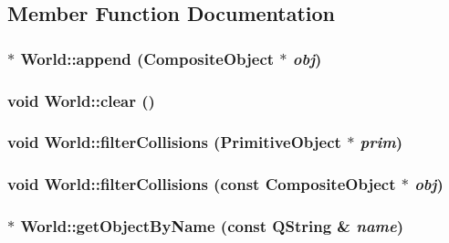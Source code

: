 \subsection{Member Function Documentation}
\hypertarget{class_robot_model_1_1_world_adbfd8acea10b8375ed35c737afd5b929}{
\subsubsection[{append}]{ $\ast$ World::append ({\bf CompositeObject} $\ast$ {\em obj})}}
\label{class_robot_model_1_1_world_adbfd8acea10b8375ed35c737afd5b929}
\hypertarget{class_robot_model_1_1_world_a24f6906f2e4f0c761653a8f9e42588a6}{
\subsubsection[{clear}]{\setlength{\rightskip}{0pt plus 5cm}void World::clear ()}}
\label{class_robot_model_1_1_world_a24f6906f2e4f0c761653a8f9e42588a6}
\hypertarget{class_robot_model_1_1_world_a38aea4885454231131d4ccb7945138dc}{
\subsubsection[{filterCollisions}]{\setlength{\rightskip}{0pt plus 5cm}void World::filterCollisions ({\bf PrimitiveObject} $\ast$ {\em prim})}}
\label{class_robot_model_1_1_world_a38aea4885454231131d4ccb7945138dc}
\hypertarget{class_robot_model_1_1_world_a530cb18d1249f7c6e94c4ba6879cf36a}{
\subsubsection[{filterCollisions}]{\setlength{\rightskip}{0pt plus 5cm}void World::filterCollisions (const {\bf CompositeObject} $\ast$ {\em obj})}}
\label{class_robot_model_1_1_world_a530cb18d1249f7c6e94c4ba6879cf36a}
\hypertarget{class_robot_model_1_1_world_a2ccf0c4dd817ecae42edbb82f54289a2}{
\subsubsection[{getObjectByName}]{ $\ast$ World::getObjectByName (const QString \& {\em name})}}
